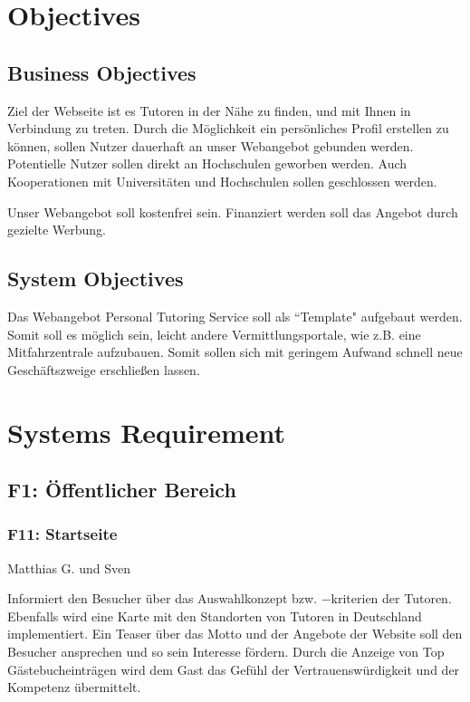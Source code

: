 \documentclass[10pt,a4paper]{scrartcl}
\begin{document}
\section{Objectives} 

\subsection{Business Objectives}
Ziel der Webseite ist es Tutoren in der Nähe zu finden, und mit Ihnen in 
Verbindung zu treten. Durch die Möglichkeit ein persönliches Profil erstellen zu 
können, sollen Nutzer dauerhaft an unser Webangebot gebunden werden. 
Potentielle Nutzer sollen direkt an Hochschulen geworben werden. Auch 
Kooperationen mit Universitäten und Hochschulen sollen geschlossen werden.

Unser Webangebot soll kostenfrei sein. Finanziert werden soll das Angebot durch 
gezielte Werbung.

\subsection{System Objectives}
Das Webangebot Personal Tutoring Service soll als ``Template" aufgebaut werden. 
Somit soll es möglich sein, leicht andere Vermittlungsportale, wie z.B. eine 
Mitfahrzentrale aufzubauen. Somit sollen sich mit geringem Aufwand schnell neue 
Geschäftszweige erschließen lassen.

\section{Systems Requirement}

\subsection{F1: Öffentlicher Bereich}
\subsubsection*{F11: Startseite}
Matthias G. und Sven

Informiert den Besucher über das Auswahlkonzept bzw. $-$kriterien der Tutoren. Ebenfalls wird eine Karte mit den Standorten von Tutoren in Deutschland implementiert. Ein Teaser über das Motto und der Angebote der Website soll den Besucher ansprechen und so sein Interesse fördern. Durch die Anzeige von Top Gästebucheinträgen wird dem Gast das Gefühl der Vertrauenswürdigkeit und der Kompetenz übermittelt. 
\end{document}
